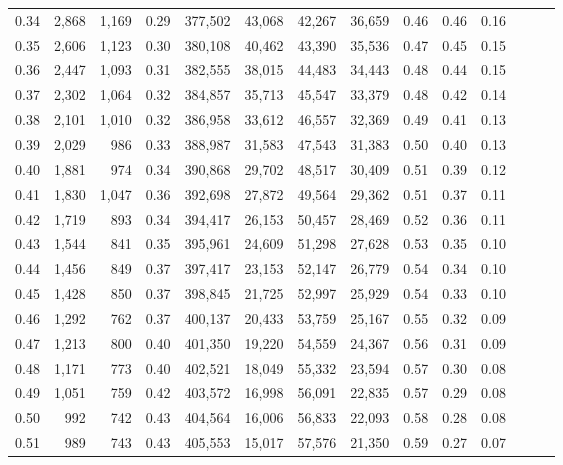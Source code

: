 \begin{tabular}{rrrrrrrrrrrrrr}
0.34 &   2,868 &  1,169 &  0.29 &  377,502 &   43,068 &  42,267 &  36,659 &  0.46 &  0.46 &      0.16 \\
0.35 &   2,606 &  1,123 &  0.30 &  380,108 &   40,462 &  43,390 &  35,536 &  0.47 &  0.45 &      0.15 \\
0.36 &   2,447 &  1,093 &  0.31 &  382,555 &   38,015 &  44,483 &  34,443 &  0.48 &  0.44 &      0.15 \\
0.37 &   2,302 &  1,064 &  0.32 &  384,857 &   35,713 &  45,547 &  33,379 &  0.48 &  0.42 &      0.14 \\
0.38 &   2,101 &  1,010 &  0.32 &  386,958 &   33,612 &  46,557 &  32,369 &  0.49 &  0.41 &      0.13 \\
0.39 &   2,029 &    986 &  0.33 &  388,987 &   31,583 &  47,543 &  31,383 &  0.50 &  0.40 &      0.13 \\
0.40 &   1,881 &    974 &  0.34 &  390,868 &   29,702 &  48,517 &  30,409 &  0.51 &  0.39 &      0.12 \\
0.41 &   1,830 &  1,047 &  0.36 &  392,698 &   27,872 &  49,564 &  29,362 &  0.51 &  0.37 &      0.11 \\
0.42 &   1,719 &    893 &  0.34 &  394,417 &   26,153 &  50,457 &  28,469 &  0.52 &  0.36 &      0.11 \\
0.43 &   1,544 &    841 &  0.35 &  395,961 &   24,609 &  51,298 &  27,628 &  0.53 &  0.35 &      0.10 \\
0.44 &   1,456 &    849 &  0.37 &  397,417 &   23,153 &  52,147 &  26,779 &  0.54 &  0.34 &      0.10 \\
0.45 &   1,428 &    850 &  0.37 &  398,845 &   21,725 &  52,997 &  25,929 &  0.54 &  0.33 &      0.10 \\
0.46 &   1,292 &    762 &  0.37 &  400,137 &   20,433 &  53,759 &  25,167 &  0.55 &  0.32 &      0.09 \\
0.47 &   1,213 &    800 &  0.40 &  401,350 &   19,220 &  54,559 &  24,367 &  0.56 &  0.31 &      0.09 \\
0.48 &   1,171 &    773 &  0.40 &  402,521 &   18,049 &  55,332 &  23,594 &  0.57 &  0.30 &      0.08 \\
0.49 &   1,051 &    759 &  0.42 &  403,572 &   16,998 &  56,091 &  22,835 &  0.57 &  0.29 &      0.08 \\
0.50 &     992 &    742 &  0.43 &  404,564 &   16,006 &  56,833 &  22,093 &  0.58 &  0.28 &      0.08 \\
0.51 &     989 &    743 &  0.43 &  405,553 &   15,017 &  57,576 &  21,350 &  0.59 &  0.27 &      0.07 \\

\end{tabular}
